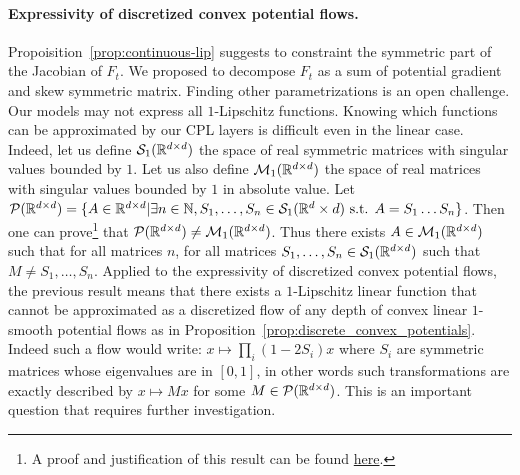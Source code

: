 \paragraph{Expressivity of discretized convex potential flows.}
Propoisition~\ref{prop:continuous-lip} suggests to constraint the symmetric part of the Jacobian of $F_t$. We proposed to decompose $F_t$ as a sum of potential gradient and skew symmetric matrix. Finding other parametrizations is an open challenge.
Our models may not express all $1$-Lipschitz functions.
Knowing which functions can be approximated by our CPL layers is difficult even in the linear case. Indeed, let us define $\mathcal{S}_1(\mathbb{R}^{d\times d})$ the space of real symmetric matrices with singular values bounded by $1$. Let us also define $\mathcal{M}_1(\mathbb{R}^{d\times d})$ the space of real matrices with singular values bounded by $1$ in absolute value.
Let $\mathcal{P}(\mathbb{R}^{d\times d})=\{A\in\mathbb{R}^{d\times d}|\exists n\in \mathbb{N},S_1,\dots,S_n\in \mathcal{S}_1(\mathbb{R}^d\times d)\text{ s.t. } A = S_1\dots S_n\}$. Then one can prove\footnote{A proof and justification of this result can be found \href{https://mathoverflow.net/questions/60174/factorization-of-a-real-matrix-into-hermitian-x-hermitian-is-it-stable}{here}.} that $\mathcal{P}(\mathbb{R}^{d\times d}) \neq \mathcal{M}_1(\mathbb{R}^{d\times d})$. Thus there exists $A\in\mathcal{M}_1(\mathbb{R}^{d\times d})$ such that for all matrices $n$, for all matrices $S_1,\dots,S_n\in\mathcal{S}_1(\mathbb{R}^{d\times d})$ such that $M\neq S_1,\dots,S_n$. Applied to the expressivity of discretized convex potential flows, the previous result means that there exists a $1$-Lipschitz linear function that cannot be approximated as a discretized flow of any depth of convex linear $1$-smooth potential flows as in Proposition~\ref{prop:discrete_convex_potentials}. Indeed such a flow would write: $x\mapsto\prod_i(1-2S_i)x$ where $S_i$ are symmetric matrices whose eigenvalues are in $[0,1]$, in other words such transformations are exactly described by $x\mapsto Mx$  for some $M\in\mathcal{P}(\mathbb{R}^{d\times d})$. This is  an important question that requires further investigation. 


